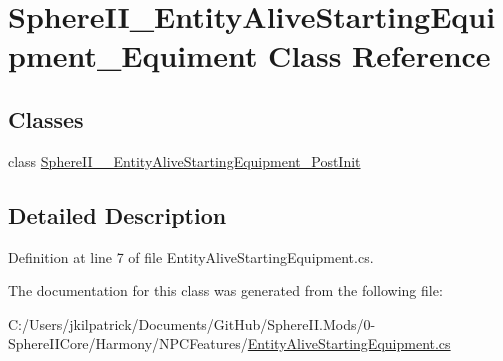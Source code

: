 \hypertarget{class_sphere_i_i___entity_alive_starting_equipment___equiment}{}\section{Sphere\+I\+I\+\_\+\+Entity\+Alive\+Starting\+Equipment\+\_\+\+Equiment Class Reference}
\label{class_sphere_i_i___entity_alive_starting_equipment___equiment}
\subsection*{Classes}
\begin{DoxyCompactItemize}
\item 
class \mbox{\hyperlink{class_sphere_i_i___entity_alive_starting_equipment___equiment_1_1_sphere_i_i_____entity_alive_starting_equipment___post_init}{Sphere\+I\+I\+\_\+\+\_\+\+Entity\+Alive\+Starting\+Equipment\+\_\+\+Post\+Init}}
\end{DoxyCompactItemize}


\subsection{Detailed Description}


Definition at line 7 of file Entity\+Alive\+Starting\+Equipment.\+cs.



The documentation for this class was generated from the following file\+:\begin{DoxyCompactItemize}
\item 
C\+:/\+Users/jkilpatrick/\+Documents/\+Git\+Hub/\+Sphere\+I\+I.\+Mods/0-\/\+Sphere\+I\+I\+Core/\+Harmony/\+N\+P\+C\+Features/\mbox{\hyperlink{_entity_alive_starting_equipment_8cs}{Entity\+Alive\+Starting\+Equipment.\+cs}}\end{DoxyCompactItemize}
